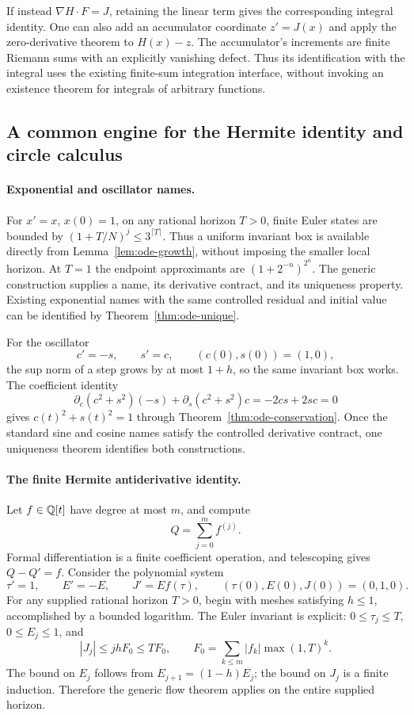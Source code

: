 If instead $\nabla H\cdot F=J$, retaining the linear term gives the
corresponding integral identity.  One can also add an accumulator coordinate
$z'=J(x)$ and apply the zero-derivative theorem to $H(x)-z$.
The accumulator's increments are finite Riemann sums with an explicitly
vanishing defect.  Thus its identification with the integral uses the
existing finite-sum integration interface, without invoking an existence
theorem for integrals of arbitrary functions.

\subsection{A common engine for the Hermite identity and circle calculus}

\paragraph{Exponential and oscillator names.}
For $x'=x$, $x(0)=1$, on any rational horizon $T>0$, finite Euler states
are bounded by
$(1+T/N)^j\le3^{\lceil T\rceil}$.  Thus a uniform invariant box is
available directly from Lemma~\ref{lem:ode-growth}, without imposing
the smaller local horizon.  At $T=1$ the endpoint approximants are
$(1+2^{-n})^{2^n}$.  The generic construction supplies a name, its
derivative contract, and its uniqueness property.  Existing exponential
names with the same controlled residual and initial value can be identified
by Theorem~\ref{thm:ode-unique}.

For the oscillator
\[
 c'=-s,\qquad s'=c,\qquad(c(0),s(0))=(1,0),
\]
the sup norm of a step grows by at most $1+h$, so the same invariant
box works.  The coefficient identity
\[
 \partial_c(c^2+s^2)(-s)+\partial_s(c^2+s^2)c
       =-2cs+2sc=0
\]
gives $c(t)^2+s(t)^2=1$ through Theorem~\ref{thm:ode-conservation}.
Once the standard sine and cosine names satisfy the controlled derivative
contract, one uniqueness theorem identifies both constructions.

\paragraph{The finite Hermite antiderivative identity.}
Let $f\in\mathbb Q[t]$ have degree at most $m$, and compute
\[
 Q=\sum_{j=0}^{m}f^{(j)}.
\]
Formal differentiation is a finite coefficient operation, and telescoping
gives $Q-Q'=f$.  Consider the polynomial system
\begin{equation}
 \tau'=1,\qquad E'=-E,\qquad J'=E f(\tau),
 \qquad (\tau(0),E(0),J(0))=(0,1,0).
 \label{eq:hermite-flow}
\end{equation}
For any supplied rational horizon $T>0$, begin with meshes satisfying
$h\le1$, accomplished by a bounded logarithm.  The Euler invariant is
explicit: $0\le\tau_j\le T$, $0\le E_j\le1$, and
\[
 |J_j|\le jh F_0\le TF_0,\qquad
 F_0=\sum_{k\le m}|f_k|\max(1,T)^k.
\]
The bound on $E_j$ follows from $E_{j+1}=(1-h)E_j$; the bound on $J_j$
is a finite induction.  Therefore the generic flow theorem applies on
the entire supplied horizon.

